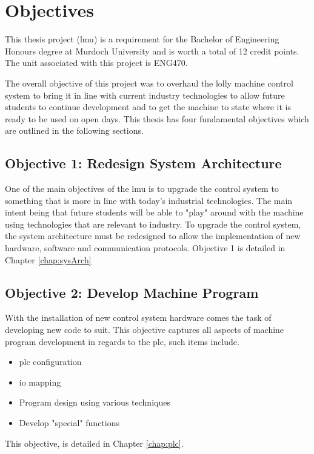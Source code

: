 \section{Objectives}
   This thesis project (\acrfull{lmu}) is a requirement for the Bachelor of Engineering Honours degree at Murdoch University and is worth a total of 12 credit points. The unit associated with this project is ENG470. 
   
   The overall objective of this project was to overhaul the lolly machine control system to bring it in line with current industry technologies to allow future students to continue development and to get the machine to state where it is ready to be used on open days. This thesis  has four fundamental objectives which are outlined in the following sections.
   
    
    \subsection{Objective 1: Redesign System Architecture}
        One of the main objectives of the \acrshort{lmu} is to upgrade the control system to something that is more in line with today's industrial technologies. The main intent being that future students will be able to  "play" around with the machine using technologies that are relevant to industry. To upgrade the control system, the system architecture must be redesigned to allow the implementation of new hardware, software and communication protocols. Objective 1 is detailed in Chapter \ref{chap:sysArch}
        
    \subsection{Objective 2: Develop Machine Program}
        With the installation of new control system hardware comes the task of developing new code to suit.
        This objective captures all aspects of machine program development in regards to the \acrshort{plc}, such items include.
        \begin{itemize}
            \item \acrshort{plc} configuration
            \item \acrshort{io} mapping
            \item Program design using various techniques
            \item Develop "special" functions
        \end{itemize}
        This objective, is detailed in Chapter \ref{chap:plc}.
        

